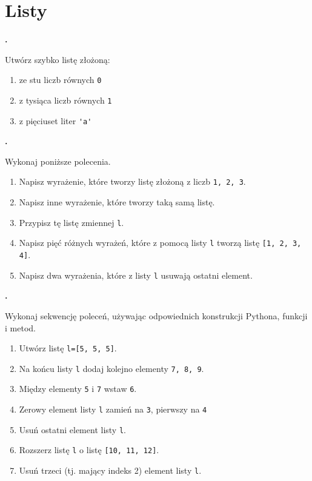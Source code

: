 \documentclass[a4paper]{article}
\begin{document}
\section{Listy}

\textbf{.}\addtocounter{zadanie}{1} Utwórz szybko listę złożoną:
\begin{enumerate}[label=\arabic*.]
    \item ze stu liczb równych \verb|0|
    \item z tysiąca liczb równych \verb|1|
    \item z pięciuset liter \verb|'a'|
\end{enumerate}


\textbf{.}\addtocounter{zadanie}{1} Wykonaj poniższe polecenia.
\begin{enumerate}[label=\arabic*.]
    \item Napisz wyrażenie, które tworzy listę złożoną z liczb \verb|1, 2, 3|.
    \item Napisz inne wyrażenie, które tworzy taką samą listę.
    \item Przypisz tę listę zmiennej \verb|l|.
    \item Napisz pięć różnych wyrażeń, które z pomocą listy \verb|l| tworzą listę \verb|[1, 2, 3, 4]|.
    \item Napisz dwa wyrażenia, które z listy \verb|l| usuwają ostatni element.
\end{enumerate}

\textbf{.}\addtocounter{zadanie}{1} Wykonaj sekwencję poleceń, używając odpowiednich konstrukcji Pythona, funkcji i metod.

\begin{enumerate}[label=\arabic*.]
    \item Utwórz listę \verb|l=[5, 5, 5]|.
    \item Na końcu listy \verb|l| dodaj kolejno elementy \verb|7, 8, 9|.
    \item Między elementy \verb|5| i \verb|7| wstaw \verb|6|.
    \item Zerowy element listy \verb|l| zamień na \verb|3|, pierwszy na \verb|4|
    \item Usuń ostatni element listy \verb|l|.
    \item Rozszerz listę \verb|l| o listę \verb|[10, 11, 12]|.
    \item Usuń trzeci (tj. mający indeks 2) element listy \verb|l|.
\end{enumerate}
\end{document}
